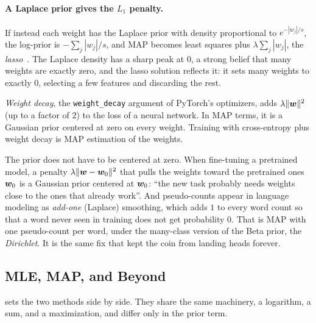 \paragraph{A Laplace prior gives the $L_1$ penalty.}
If instead each weight has the Laplace prior with density proportional
to $e^{-|w_j|/s}$, the log-prior is $-\sum_j |w_j|/s$, and MAP becomes
least squares plus $\lambda \sum_j |w_j|$, the \emph{lasso}~\cite{tibshirani1996lasso}. The Laplace
density has a sharp peak at $0$, a strong belief that many weights are
exactly zero, and the lasso solution reflects it: it sets many weights
to exactly $0$, selecting a few features and discarding the rest.

\begin{aibox}
  \emph{Weight decay}, the \texttt{weight\_decay} argument of PyTorch's
  optimizers, adds $\lambda\|\bm{w}\|^2$ (up to a factor of $2$) to the
  loss of a neural network. In MAP terms, it is a Gaussian prior centered
  at zero on every weight. Training with cross-entropy plus weight decay
  is MAP estimation of the weights.

  The prior does not have to be centered at zero. When fine-tuning a
  pretrained model, a penalty $\lambda\|\bm{w} - \bm{w}_0\|^2$ that
  pulls the weights toward the pretrained ones $\bm{w}_0$ is a
  Gaussian prior centered at $\bm{w}_0$: ``the new task probably needs
  weights close to the ones that already work''. And pseudo-counts appear
  in language modeling as \emph{add-one} (Laplace) smoothing, which adds
  $1$ to every word count so that a word never seen in training does not
  get probability $0$. That is MAP with one pseudo-count per word, under
  the many-class version of the Beta prior, the \emph{Dirichlet}. It is
  the same fix that kept the coin from landing heads forever.
\end{aibox}

\subsection{MLE, MAP, and Beyond}
\label{sec:ch06-map-compare}

 sets the two methods side by side. They share
the same machinery, a logarithm, a sum, and a maximization, and differ
only in the prior term.


